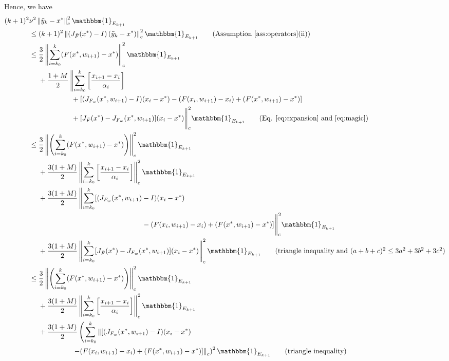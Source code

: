 \documentclass[letterpaper, 10 pt]{article}
\newcommand{\ty}{\tilde{y}}
\begin{document}
Hence, we have
\begin{align*}
    (k+1)^2 & \nu^2 \left\|\ty_{k}-x^* \right\|^2_c \mathbbm{1}_{E_{k+1}}\\
    &\leq (k+1)^2 \left\|\left(J_{\bar{F}}(x^*)-I \right)(\ty_{k}-x^*) \right\|^2_c\mathbbm{1}_{E_{k+1}}\tag{Assumption \ref{ass:operators}(ii)}\\
    &\leq  \frac{3}{2}\left\|\sum\limits_{i=k_0}^{k}   (F(x^*,w_{i+1})-x^*) \right\|^2_c\mathbbm{1}_{E_{k+1}} \\
    &\quad~+\frac{1+M}{2} \left\| \sum\limits_{i=k_0}^{k} \left[\frac{x_{i+1}-x_i}{\alpha_i}  \right]\right.\\
    &\quad\quad\quad\quad\quad\quad+ [(J_{F_w}(x^*,w_{i+1})-I)(x_i-x^*) - (F(x_i,w_{i+1})-x_i) + (F(x^*,w_{i+1})-x^*)]\\
    &\quad\quad\quad\quad\quad\quad+ [J_{\bar{F}}(x^*)-J_{F_w}(x^*,w_{i+1})](x_i-x^*) \Bigg\|^2_c\mathbbm{1}_{E_{k+1}} \tag{Eq. \eqref{eq:expansion} and \eqref{eq:magic}}\\
    &\leq \frac{3}{2}\left\|\left(\sum\limits_{i=k_0}^{k}   (F(x^*,w_{i+1})- x^*) \right)\right\|^2_c\mathbbm{1}_{E_{k+1}} \\
    &\quad~+ \frac{3(1+M)}{2} \left\| \sum\limits_{i=k_0}^{k} \left[\frac{x_{i+1}-x_i}{\alpha_i}  \right]\right\|^2_c\mathbbm{1}_{E_{k+1}}\\
    &\quad~+ \frac{3(1+M)}{2} \left\|\sum\limits_{i=k_0}^{k}[(J_{F_w}(x^*,w_{i+1})-I)(x_i-x^*) \right.\\
    &\qquad\qquad\qquad\qquad\qquad\qquad\qquad\qquad - (F(x_i,w_{i+1})-x_i) + (F(x^*,w_{i+1})-x^*)]\Bigg\|^2_c\mathbbm{1}_{E_{k+1}}\\
    &\quad~+ \frac{3(1+M)}{2}  \left\|\sum\limits_{i=k_0}^{k} [J_{\bar{F}}(x^*)-J_{F_w}(x^*,w_{i+1})](x_i-x^*) \right\|^2_c\mathbbm{1}_{E_{k+1}} \tag{triangle inequality and $(a+b+c)^2\leq 3a^2+3b^2+3c^2$} \\
    &\leq  \frac{3}{2}\left\| \left(\sum\limits_{i=k_0}^{k}   (F(x^*,w_{i+1})-x^*) \right)\right\|^2_c\mathbbm{1}_{E_{k+1}} \\
    &\quad~+\frac{3(1+M)}{2} \left\| \sum\limits_{i=k_0}^{k} \left[\frac{x_{i+1}-x_i}{\alpha_i}  \right]\right\|^2_c\mathbbm{1}_{E_{k+1}}\\
    &\quad~+ \frac{3(1+M)}{2} \left(\sum\limits_{i=k_0}^{k}\left\|[(J_{F_w}(x^*,w_{i+1})-I)(x_i-x^*)\right.\right. \\
    &\quad\quad \quad\quad\quad\quad\left.\left.- (F(x_i,w_{i+1})-x_i) + (F(x^*,w_{i+1})-x^*)]\right\|_c\right)^2\mathbbm{1}_{E_{k+1}}\tag{triangle inequality}\\

\end{align*}
\end{document}
